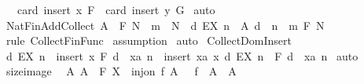 \begin{isabellebody}
\ \ \ card\ {\isacharparenleft}insert\ x\ F{\isacharparenright}\ {\isacharequal}\ card\ {\isacharparenleft}insert\ y\ G{\isacharparenright}{\isachardoublequoteclose}\isanewline
%
\isadelimproof
%
\endisadelimproof
%
\isatagproof
{}\isamarkupfalse%
\ auto\isanewline
{}\isamarkupfalse%
%
\endisatagproof
{\isafoldproof}%
%
\isadelimproof
\isanewline
%
\endisadelimproof
\isanewline
\isanewline
{}\isamarkupfalse%
\ Nat{\isacharunderscore}Fin{\isacharunderscore}Add{\isacharunderscore}Collect{\isacharcolon}\ {\isachardoublequoteopen}{\isacharbrackleft}{\isacharbar}A\ {\isacharcolon}\ {\isacharpercent}F\ {\isacharpercent}N\ {\isacharsemicolon}\ m\ {\isacharcolon}\ {\isacharpercent}N{\isacharbar}{\isacharbrackright}\ {\isacharequal}{\isacharequal}{\isachargreater}\ {\isacharbraceleft}d{\isachardot}\ EX\ n\ {\isacharcolon}\ A{\isachardot}\ d\ {\isacharequal}\ {\isacharparenleft}n\ {\isacharplus}\ m{\isacharparenright}{\isacharbraceright}{\isacharcolon}\ {\isacharpercent}F\ {\isacharpercent}N{\isachardoublequoteclose}\isanewline
%
\isadelimproof
%
\endisadelimproof
%
\isatagproof
{}\isamarkupfalse%
\ {\isacharparenleft}rule\ Collect{\isacharunderscore}Fin{\isacharunderscore}Func{\isacharparenright}\isanewline
{}\isamarkupfalse%
\ assumption\isanewline
{}\isamarkupfalse%
\ auto\isanewline
{}\isamarkupfalse%
%
\endisatagproof
{\isafoldproof}%
%
\isadelimproof
\isanewline
%
\endisadelimproof
\isanewline
{}\isamarkupfalse%
\ Collect{\isacharunderscore}Dom{\isacharunderscore}Insert{\isacharcolon}\ \isanewline
\ {\isachardoublequoteopen}{\isacharbraceleft}d{\isachardot}\ EX\ n\ {\isacharcolon}\ insert\ x\ F{\isachardot}\ d\ {\isacharequal}\ xa\ n{\isacharbraceright}\ {\isacharequal}\ insert\ {\isacharparenleft}xa\ x{\isacharparenright}\ {\isacharbraceleft}d{\isachardot}\ EX\ n\ {\isacharcolon}\ F{\isachardot}\ d\ {\isacharequal}\ xa\ n{\isacharbraceright}{\isachardoublequoteclose}\isanewline
%
\isadelimproof
%
\endisadelimproof
%
\isatagproof
{}\isamarkupfalse%
\ auto\isanewline
{}\isamarkupfalse%
%
\endisatagproof
{\isafoldproof}%
%
\isadelimproof
\isanewline
%
\endisadelimproof
\isanewline
\isanewline
{}\isamarkupfalse%
\ size{\isacharunderscore}image{\isacharcolon}\ \isanewline
\ {\isachardoublequoteopen}{\isacharbang}{\isacharbang}A{\isachardot}\ {\isacharbrackleft}{\isacharbar}A\ {\isacharcolon}\ {\isacharpercent}F\ X\ {\isacharsemicolon}\ inj{\isacharunderscore}on\ f\ A\ {\isacharbar}{\isacharbrackright}\ {\isacharequal}{\isacharequal}{\isachargreater}\ {\isacharhash}{\isacharparenleft}f\ {\isacharbackquote}\ A{\isacharparenright}\ {\isacharequal}\ {\isacharhash}A{\isachardoublequoteclose}\isanewline

\end{isabellebody}
